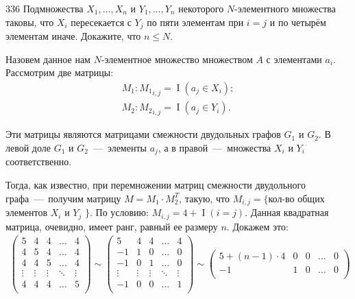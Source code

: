 \begin{task}{336}
Подмножества $X_1, \dots , X_n$ и $Y_1, \dots, Y_n$ некоторого $N$-элементного множества таковы, что $X_i$ пересекается с $Y_j$ по пяти элементам при $i = j$ и по четырём элементам иначе. Докажите, что $n \leq N$.
\end{task}

\begin{solution}
Назовем данное нам $N$-элементное множество множеством $A$ с элементами $a_i$. Рассмотрим две матрицы:
\begin{gather*}
    M_1 : {M_1}_{i,j} = \operatorname{I}(a_j \in X_i); \\
    M_2 : {M_2}_{i,j} = \operatorname{I}(a_j \in Y_i).
\end{gather*}\par
Эти матрицы являются матрицами смежности двудольных графов $G_1$ и $G_2$. В левой доле $G_1$ и $G_2$~---~элементы $a_ j$, а в правой~---~множества $X_i$ и $Y_i$ соответственно.\par
Тогда, как известно, при перемножении матриц смежности двудольного графа~---~получим матрицу $M = M_1 \cdot M_2^T$, такую, что ${M}_{i,j} = \{$кол-во общих элементов $X_i$ и $Y_j$ $\}$. По условию: $M_{i,j} = 4 + \operatorname{I}(i = j)$. Данная квадратная матрица, очевидно, имеет ранг, равный ее размеру $n$. Докажем это: 
\begin{gather*}
    \begin {pmatrix}
    	5& 4& 4& \ldots& 4 \\
    	4& 5& 4& \ldots& 4 \\
    	4& 4& 5& \ldots& 4 \\
    	\vdots& \vdots& \vdots& \ddots& \vdots \\
    	4& 4& 4& \ldots& 5 \\
    \end {pmatrix} \sim
    \begin {pmatrix}
    	5& 4& 4& \ldots& 4 \\
    	-1& 1& 0& \ldots& 0 \\
    	-1& 0& 1& \ldots& 0 \\
    	\vdots& \vdots& \vdots& \ddots& \vdots \\
    	-1& 0& 0& \ldots& 1 \\
    \end {pmatrix} \sim
    \begin {pmatrix}
    	5+(n-1)\cdot4& 0& 0& \ldots& 0 \\
    	-1& 1& 0& \ldots& 0 \\

\end{pmatrix}
\end{gather*}
\end{solution}
